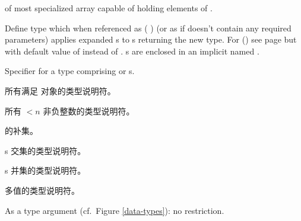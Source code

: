 \begin{LIST}{1cm}
  {
   of most specialized array capable of holding
  elements of . 
  }

  {
  Define type  which when referenced as (
  ) (or as  if 
  doesn't contain any required parameters) applies expanded s to s
  returning the new type. For () see
  page \pageref{section:宏} but with default value of \kwd{\A}
  instead of \NIL. s are enclosed in an implicit 
  named .
  }

  {
  Specifier for a type comprising  or s.
  }

  {
  所有满足  对象的类型说明符。
  }

  {
  所有 $<n$ 非负整数的类型说明符。
  }

  {
   的补集。
  }

  {
  s 交集的类型说明符。
  }

  {
  s 并集的类型说明符。
  }

  {
  多值的类型说明符。
  }

  \IT{\kwd{\A}}
  {
    As a type argument (cf.\ Figure \ref{data-types}): no restriction.
  }
  \end{LIST}



